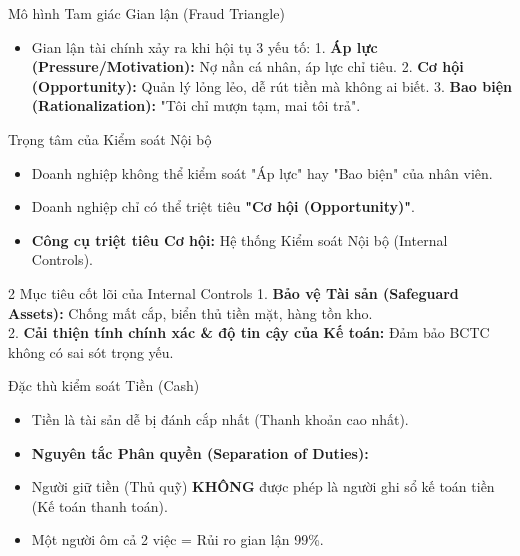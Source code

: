 \documentclass[aspectratio=169]{beamer}
\begin{document}
\begin{frame}{Mô hình Tam giác Gian lận (Fraud Triangle)}
    \begin{itemize}
        \item Gian lận tài chính xảy ra khi hội tụ 3 yếu tố:
        1. \textbf{Áp lực (Pressure/Motivation):} Nợ nần cá nhân, áp lực chỉ tiêu.
        2. \textbf{Cơ hội (Opportunity):} Quản lý lỏng lẻo, dễ rút tiền mà không ai biết.
        3. \textbf{Bao biện (Rationalization):} "Tôi chỉ mượn tạm, mai tôi trả".
    \end{itemize}
\end{frame}


\begin{frame}{Trọng tâm của Kiểm soát Nội bộ}
    \begin{itemize}
        \item Doanh nghiệp không thể kiểm soát "Áp lực" hay "Bao biện" của nhân viên.
        \item Doanh nghiệp chỉ có thể triệt tiêu \textbf{"Cơ hội (Opportunity)"}.
        \item \textbf{Công cụ triệt tiêu Cơ hội:} Hệ thống Kiểm soát Nội bộ (Internal Controls).
    \end{itemize}
\end{frame}


\begin{frame}{2 Mục tiêu cốt lõi của Internal Controls}
    1. \textbf{Bảo vệ Tài sản (Safeguard Assets):} Chống mất cắp, biển thủ tiền mặt, hàng tồn kho.\\
    2. \textbf{Cải thiện tính chính xác \& độ tin cậy của Kế toán:} Đảm bảo BCTC không có sai sót trọng yếu.\\
\end{frame}


\begin{frame}{Đặc thù kiểm soát Tiền (Cash)}
    \begin{itemize}
        \item Tiền là tài sản dễ bị đánh cắp nhất (Thanh khoản cao nhất).
        \item \textbf{Nguyên tắc Phân quyền (Separation of Duties):}
        \item Người giữ tiền (Thủ quỹ) \textbf{KHÔNG} được phép là người ghi sổ kế toán tiền (Kế toán thanh toán).
        \item Một người ôm cả 2 việc = Rủi ro gian lận 99\%.
    \end{itemize}
\end{frame}
\end{document}
